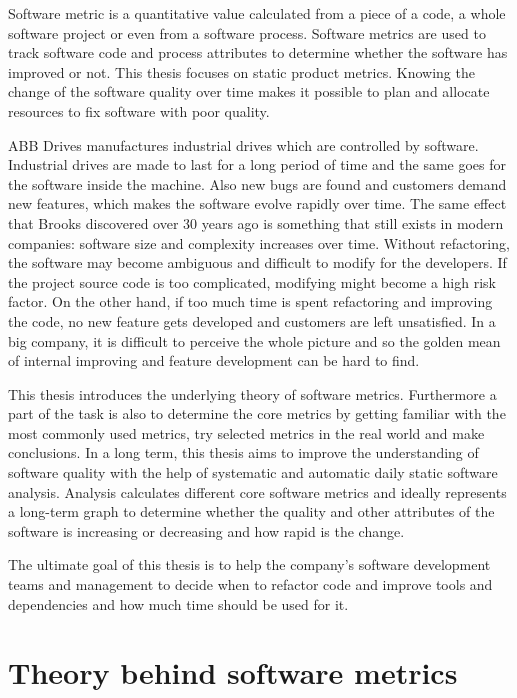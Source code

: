 Software metric is a quantitative value calculated from a piece of a code, a whole software project or even from a software process. Software metrics are used to track software code and process attributes to determine whether the software has improved or not. This thesis focuses on static product metrics. Knowing the change of the software quality over time makes it possible to plan and allocate resources to fix software with poor quality.

ABB Drives manufactures industrial drives which are controlled by software. Industrial drives are made to last for a long period of time and the same goes for the software inside the machine. Also new bugs are found and customers demand new features, which makes the software evolve rapidly over time. The same effect that Brooks discovered over 30 years ago is something that still exists in modern companies: software size and complexity increases over time. Without refactoring, the software may become ambiguous and difficult to modify for the developers. If the project source code is too complicated, modifying might become a high risk factor. On the other hand, if too much time is spent refactoring and improving the code, no new feature gets developed and customers are left unsatisfied. In a big company, it is difficult to perceive the whole picture and so the golden mean of internal improving and feature development can be hard to find.

This thesis introduces the underlying theory of software metrics. Furthermore a part of the task is also to determine the core metrics by getting familiar with the most commonly used metrics, try selected metrics in the real world and make conclusions. In a long term, this thesis aims to improve the understanding of software quality with the help of systematic and automatic daily static software analysis.  Analysis calculates different core software metrics and ideally represents a long-term graph to determine whether the quality and other attributes of the software is increasing or decreasing and how rapid is the change.

The ultimate goal of this thesis is to help the company’s software development teams and management to decide when to refactor code and improve tools and dependencies and how much time should be used for it.





\chapter{Theory behind software metrics}
\label{chap:theory}

